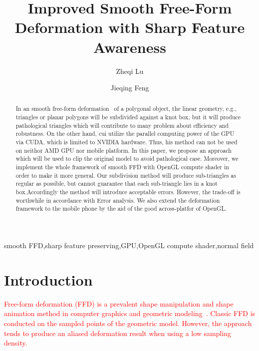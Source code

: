 \documentclass[3p]{elsarticle}
\begin{document}
\begin{frontmatter}

\title{Improved Smooth Free-Form Deformation with Sharp Feature Awareness}

\author{Zheqi Lu}

\author{Jieqing Feng}

\address{State Key Lab of CAD\&CG, Zhejiang University, China}

\begin{abstract}
In an smooth free-form deformation~\cite{Cui15} of a polygonal object, the linear geometry, e.g., triangles or planar polygons will be subdivided against a knot box, but it will produce pathological triangles which will contribute to many problem about efficiency and robustness. On the other hand, cui utilize the parallel computing power of the GPU via CUDA, which is limited to NVIDIA hardware. Thus, his method can not be used on neithor AMD GPU nor mobile platform. In this paper, we propose an approach which will be used to clip the original model to avoid pathological case. Moreover, we implement the whole framework of smooth FFD with OpenGL compute shader in order to make it more general. Our subdivision method will produce sub-triangles as regular as possible, but cannot guarantee that each sub-triangle lies in a knot box.Accordingly the method will introduce acceptable errors. However, the trade-off is worthwhile in accordance with Error analysis. We also extend the deformation framework to the mobile phone by the aid of the good across-platfor of OpenGL.
\end{abstract}

\begin{keyword}
smooth FFD\sep sharp feature preserving\sep GPU\sep OpenGL compute shader\sep normal field
\end{keyword}

\end{frontmatter}

\section{Introduction}
\textcolor{red}{Free-form deformation (FFD) is a prevalent shape manipulation and shape animation method in computer graphics and geometric modeling~\cite{Sederberg86}. Classic FFD is conducted on the sampled points of the geometric model. However, the approach tends to produce an aliased deformation result when using a low sampling density.}
\end{document}
